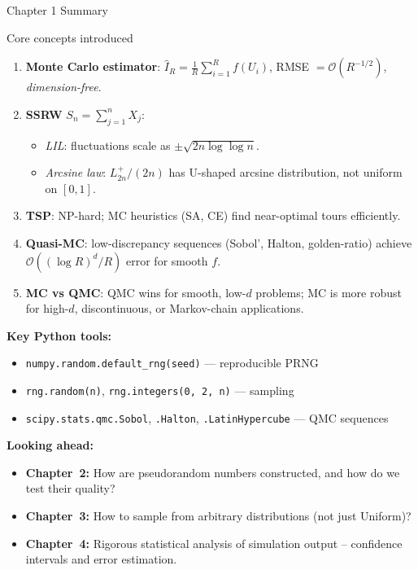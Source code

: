 \documentclass[aspectratio=169,10pt]{beamer}
\begin{document}
\begin{frame}[allowframebreaks]{Chapter 1 Summary}

  \begin{block}{Core concepts introduced}
    \begin{enumerate}
      \item \textbf{Monte Carlo estimator}:
        $\hat{I}_R = \frac{1}{R}\sum_{i=1}^R f(U_i)$,
        RMSE $= \mathcal{O}(R^{-1/2})$, \emph{dimension-free}.

      \item \textbf{SSRW} $S_n = \sum_{j=1}^n X_j$:
        \begin{itemize}
          \item \emph{LIL}: fluctuations scale as $\pm\sqrt{2n\log\log n}$.
          \item \emph{Arcsine law}: $L^+_{2n}/(2n)$ has U-shaped arcsine
            distribution, not uniform on $[0,1]$.
        \end{itemize}

      \item \textbf{TSP}: NP-hard; MC heuristics (SA, CE) find
        near-optimal tours efficiently.

      \item \textbf{Quasi-MC}: low-discrepancy sequences (Sobol', Halton,
        golden-ratio) achieve $\mathcal{O}((\log R)^d/R)$ error for smooth $f$.

      \item \textbf{MC vs QMC}: QMC wins for smooth, low-$d$ problems;
        MC is more robust for high-$d$, discontinuous, or Markov-chain
        applications.
    \end{enumerate}
  \end{block}

  \framebreak

  \textbf{Key Python tools:}
  \begin{itemize}
    \item \texttt{numpy.random.default\_rng(seed)} --- reproducible PRNG
    \item \texttt{rng.random(n)}, \texttt{rng.integers(0, 2, n)} --- sampling
    \item \texttt{scipy.stats.qmc.Sobol}, \texttt{.Halton},
      \texttt{.LatinHypercube} --- QMC sequences
  \end{itemize}

  \bigskip
  \textbf{Looking ahead:}
  \begin{itemize}
    \item \textbf{Chapter~2:} How are pseudorandom numbers constructed,
      and how do we test their quality?
    \item \textbf{Chapter~3:} How to sample from arbitrary distributions
      (not just Uniform)?
    \item \textbf{Chapter~4:} Rigorous statistical analysis of simulation
      output -- confidence intervals and error estimation.
  \end{itemize}

\end{frame}
\end{document}
